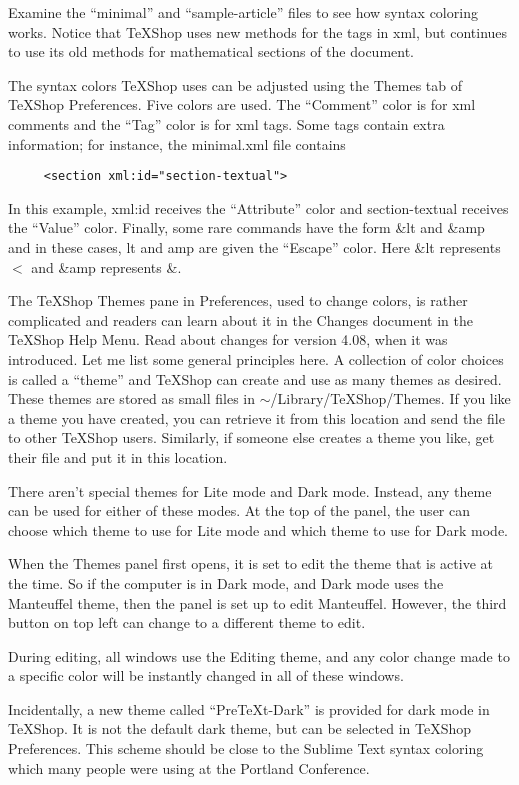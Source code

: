 \documentclass[11pt, oneside]{article}   	%
\begin{document}
Examine the ``minimal'' and ``sample-article'' files to see how syntax coloring works. Notice that TeXShop uses new methods for the tags in xml, but continues to use its old methods for  mathematical sections of the document.

The syntax colors TeXShop uses can be adjusted using the Themes tab of TeXShop Preferences. Five colors are used. The ``Comment'' color is for xml comments and the ``Tag'' color is for xml tags. Some tags contain extra information; for instance, the minimal.xml file contains 
\begin{verbatim}
     <section xml:id="section-textual">
\end{verbatim}
In this example, xml:id receives the ``Attribute'' color and section-textual receives the ``Value'' color. Finally,
some rare commands have the form \&lt and \&amp and in these cases, lt and amp are given the ``Escape'' color.
Here \&lt represents $<$ and \&amp represents \&.

The TeXShop Themes pane in Preferences, used to change colors, is rather complicated and readers can learn about it in the Changes document in the TeXShop Help Menu. Read about changes for version 4.08, when it was introduced. Let me  list some general principles here. A collection of color choices is called a ``theme'' and TeXShop can create and use as many themes as desired. These themes are stored as small files in $\sim$/Library/TeXShop/Themes. If you like a theme you have created, you can retrieve it from this location and send the file to other TeXShop users. Similarly, if someone else creates a theme you like, get their file and put it in this location.

There aren't special themes  for Lite mode and Dark mode. Instead, any theme can be used for either of these modes. At the top of the panel, the user can choose which theme to use for Lite mode and which theme to use for Dark mode. 

When the Themes panel first opens, it is set to edit the theme that is active at the time. So if the computer is in Dark mode, and Dark mode uses the Manteuffel theme, then the panel is set up to edit Manteuffel. However, the third button on top left can change to a different theme to edit.

During editing, all windows use the Editing theme, and any color change made to a specific color will be instantly changed in all of these windows.

Incidentally, a new theme called ``PreTeXt-Dark'' is provided for dark mode in TeXShop. It is not the default dark theme, but can be selected in TeXShop Preferences. This scheme should be close to the Sublime Text syntax coloring which many people were using at the Portland Conference.
\end{document}
